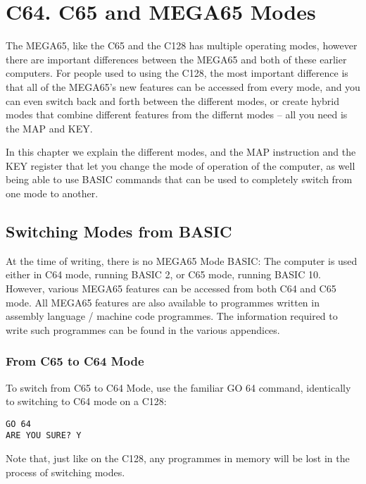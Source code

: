 \chapter {C64. C65 and MEGA65 Modes}
\label{cha:modes}

The MEGA65, like the C65 and the C128 has multiple operating modes,
however there are important differences between the MEGA65 and both
of these earlier computers.  For people used to using the C128,
the most important difference is that all of the MEGA65's new features
can be accessed from every mode, and you can even switch back and forth
between the different modes, or create hybrid modes that combine different
features from the differnt modes -- all you need is the MAP and KEY.

In this chapter we explain the different modes, and the MAP instruction and
the KEY register that let you change the mode of operation of the computer,
as well being able to use BASIC commands that can be used to completely switch
from one mode to another.

\section{Switching Modes from BASIC}

At the time of writing, there is no MEGA65 Mode BASIC: The computer is used either
in C64 mode, running BASIC 2, or C65 mode, running BASIC 10.  However, various MEGA65
features can be accessed from both C64 and C65 mode.  All MEGA65 features are also available
to programmes written in assembly language / machine code programmes.  The information required
to write such programmes can be found in the various appendices. 

\subsection{From C65 to C64 Mode}

To switch from C65 to C64 Mode, use the familiar GO 64 command, identically to switching to C64
mode on a C128:

\begin{tcolorbox}[colback=black,coltext=white]
\verbatimfont{\codefont}
\begin{verbatim}
GO 64
ARE YOU SURE? Y
\end{verbatim}
\end{tcolorbox}

Note that, just like on the C128, any programmes in memory will be lost in the process of switching modes.

